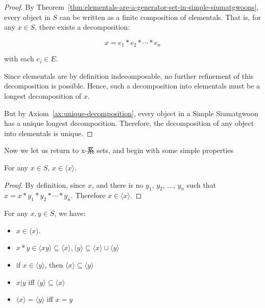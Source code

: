 \begin{proof}
    By Theorem~\ref{thm:elementals-are-a-generator-set-in-simple-siumatgwoons}, every object in $S$ can be written as a finite composition of elementals. That is, for any $x \in S$, there exists a decomposition:
    
    $$x = e_1 * e_2 * \cdots * e_n$$
    
    with each $e_i \in E$.
    
    Since elementals are by definition indecomposable, no further refinement of this decomposition is possible. Hence, such a decomposition into elementals must be a longest decomposition of $x$.

    But by Axiom~\ref{ax:unique-decomposition}, every object in a Simple Siumatgwoon has a unique longest decomposition. Therefore, the decomposition of any object into elementals is unique.
\end{proof}
    
Now we let us return to x-系 sets, and begin with some simple properties

\begin{lemma}\label{lem:an-object-is-in-its-own-emergence-set}
    For any $x\in S$, $x \in \langle x \rangle$.
\end{lemma}
\begin{proof}
    By definition, since $x$, and there is no $y_1$, $y_2$, $\ldots$, $y_n$ such that $x=x*y_1*y_2*\cdots*y_n$. Therefore $x \in \langle x \rangle$.
\end{proof}



\begin{theorem}\label{thm:properties-of-emergence-sets}
    For any $x,y\in S$, we have:
    \begin{itemize}
        \item $x \in \langle x \rangle$.
        \item $x*y \in \langle xy \rangle \subseteq \langle x \rangle , \langle y \rangle \subseteq \langle x \rangle \cup \langle y \rangle$
        \item if $x\in \langle y \rangle$, then $\langle x \rangle \subseteq \langle y \rangle$
        \item $x|y$ iff $\langle y \rangle \subseteq \langle x \rangle$
        \item $\langle x \rangle = \langle y \rangle$ iff $x =y$
        
                
    \end{itemize}
\end{theorem}



